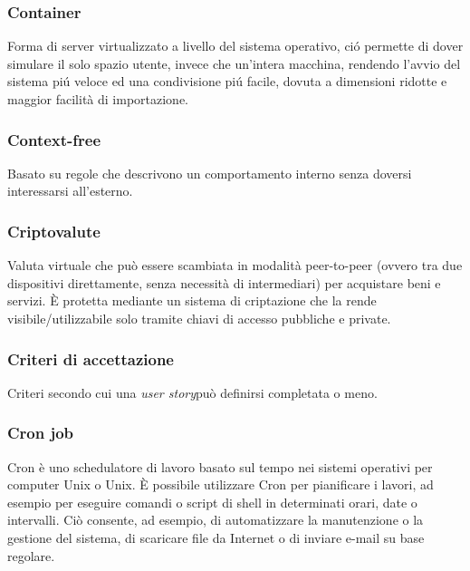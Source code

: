 \subsubsection*{Container}
Forma di server virtualizzato a livello del sistema operativo, ció permette di dover simulare il solo spazio utente, invece che un’intera macchina, rendendo l’avvio del sistema piú veloce ed una condivisione piú facile, dovuta a dimensioni ridotte e maggior facilità di importazione.
\subsubsection*{Context-free}
Basato su regole che descrivono un comportamento interno senza doversi interessarsi all'esterno.
\subsubsection*{Criptovalute}
Valuta virtuale che può essere scambiata in modalità peer-to-peer (ovvero tra due dispositivi direttamente, senza necessità di intermediari) per acquistare beni e servizi. È protetta mediante un sistema di criptazione che la rende visibile/utilizzabile solo tramite chiavi di accesso pubbliche e private.
\subsubsection*{Criteri di accettazione}
Criteri secondo cui una \textit{user story}\glo può definirsi completata o meno.
\subsubsection*{Cron job}
Cron è uno schedulatore di lavoro basato sul tempo nei sistemi operativi per computer Unix o Unix. È possibile utilizzare Cron per pianificare i lavori, ad esempio per eseguire comandi o script di shell in determinati orari, date o intervalli. Ciò consente, ad esempio, di automatizzare la manutenzione o la gestione del sistema, di scaricare file da Internet o di inviare e-mail su base regolare.
